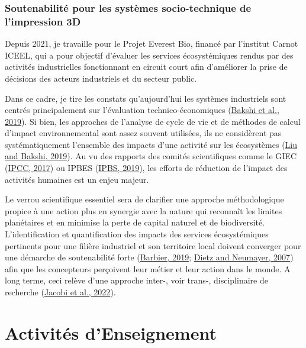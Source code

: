 \documentclass[
  11pt,
]{article}
\begin{document}
\hypertarget{soutenabilituxe9-pour-les-systuxe8mes-socio-technique-de-limpression-3d}{%
\subsubsection{Soutenabilité pour les systèmes socio-technique de
l'impression
3D}\label{soutenabilituxe9-pour-les-systuxe8mes-socio-technique-de-limpression-3d}}

Depuis 2021, je travaille pour le Projet Everest Bio, financé par
l'institut Carnot ICEEL, qui a pour objectif d'évaluer les services
écosystémiques rendus par des activités industrielles fonctionnant en
circuit court afin d'améliorer la prise de décisions des acteurs
industriels et du secteur public.

Dans ce cadre, je tire les constats qu'aujourd'hui les systèmes
industriels sont centrés principalement sur l'évaluation
technico-économiques (\protect\hyperlink{ref-Bakshi2019b}{Bakshi et al.,
2019}). Si bien, les approches de l'analyse de cycle de vie et de
méthodes de calcul d'impact environnemental sont assez souvent
utilisées, ils ne considèrent pas systématiquement l'ensemble des
impacts d'une activité sur les écosystèmes
(\protect\hyperlink{ref-Liu2019g}{Liu and Bakshi, 2019}). Au vu des
rapports des comités scientifiques comme le GIEC
(\protect\hyperlink{ref-IPCC2017}{IPCC, 2017}) ou IPBES
(\protect\hyperlink{ref-IPBS2019}{IPBS, 2019}), les efforts de réduction
de l'impact des activités humaines est un enjeu majeur.

Le verrou scientifique essentiel sera de clarifier une approche
méthodologique propice à une action plus en synergie avec la nature qui
reconnaît les limites planétaires et en minimise la perte de capital
naturel et de biodiversité. L'identification et quantification des
impacts des services écosystémiques pertinents pour une filière
industriel et son territoire local doivent converger pour une démarche
de soutenabilité forte (\protect\hyperlink{ref-Barbier2019}{Barbier,
2019}; \protect\hyperlink{ref-Dietz2006}{Dietz and Neumayer, 2007}) afin
que les concepteurs perçoivent leur métier et leur action dans le monde.
A long terme, ceci relève d'une approche inter-, voir trans-,
disciplinaire de recherche (\protect\hyperlink{ref-Jacobi2022}{Jacobi et
al., 2022}).

\newpage

\hypertarget{activituxe9s-denseignement}{%
\section{Activités d'Enseignement}\label{activituxe9s-denseignement}}
\end{document}
